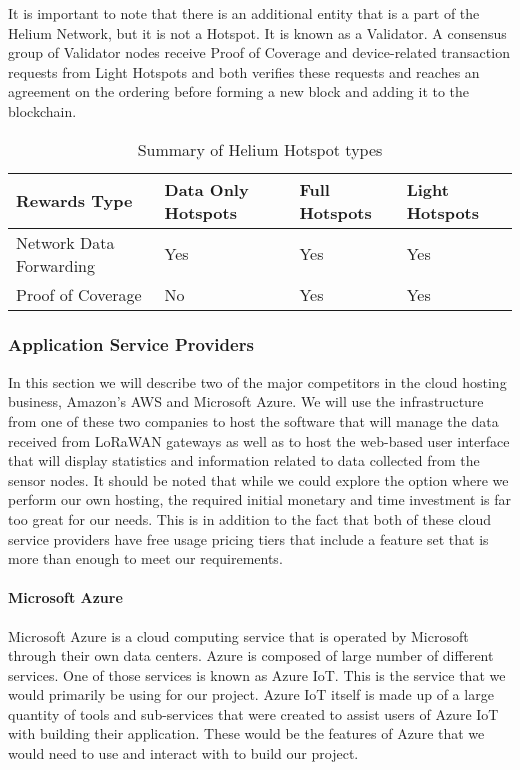 It is important to note that there is an additional entity that is a part of the Helium Network, but it is not a Hotspot. It is known as a Validator. A consensus group of Validator nodes receive Proof of Coverage and device-related transaction requests from Light Hotspots and both verifies these requests and reaches an agreement on the ordering before forming a new block and adding it to the blockchain.

\begin{table}

\centering
\caption{Summary of Helium Hotspot types}
\begin{tabular}{|l|l|l|l|}
\hline
Rewards Type & Data Only Hotspots & Full Hotspots & Light Hotspots \\
\hline
Network Data Forwarding & Yes & Yes & Yes \\\hline
Proof of Coverage & No & Yes & Yes \\\hline
\end{tabular}
\label{tab:helium-hotspot-classes}
\end{table}

\subsubsection{Application Service Providers}
In this section we will describe two of the major competitors in the cloud hosting business, Amazon's AWS and Microsoft Azure. We will use the infrastructure from one of these two companies to host the software that will manage the data received from LoRaWAN gateways as well as to host the web-based user interface that will display statistics and information related to data collected from the sensor nodes. It should be noted that while we could explore the option where we perform our own hosting, the required initial monetary and time investment is far too great for our needs. This is in addition to the fact that both of these cloud service providers have free usage pricing tiers that include a feature set that is more than enough to meet our requirements.

\paragraph{Microsoft Azure}
Microsoft Azure is a cloud computing service that is operated by Microsoft through their own data centers. Azure is composed of large number of different services. One of those services is known as Azure IoT. This is the service that we would primarily be using for our project. Azure IoT itself is made up of a large quantity of tools and sub-services that were created to assist users of Azure IoT with building their application. These would be the features of Azure that we would need to use and interact with to build our project.

